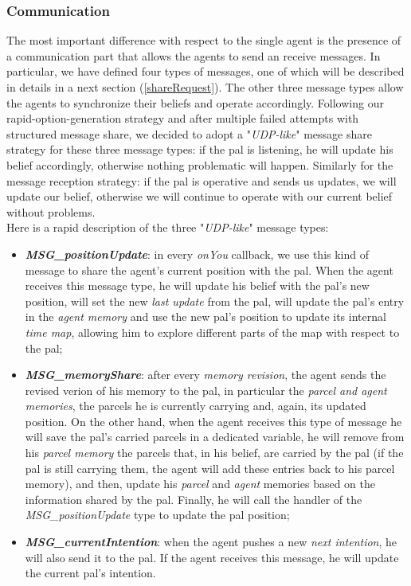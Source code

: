         \subsubsection{Communication}
            The most important difference with respect to the single agent is the presence of a communication part that allows the agents to send an receive messages. In particular, we have defined four types of messages, one of which will be described in details in a next section (\ref{shareRequest}). The other three message types allow the agents to synchronize their beliefs and operate accordingly. Following our rapid-option-generation strategy and after multiple failed attempts with structured message share, we decided to adopt a "\textit{UDP-like}" message share strategy for these three message types: if the pal is listening, he will update his belief accordingly, otherwise nothing problematic will happen. Similarly for the message reception strategy: if the pal is operative and sends us updates, we will update our belief, otherwise we will continue to operate with our current belief without problems.
            \medskip\\
            Here is a rapid description of the three "\textit{UDP-like}" message types:
            \begin{itemize}
                \item \textbf{\textit{MSG\_positionUpdate}}: in every \textit{onYou} callback, we use this kind of message to share the agent's current position with the pal. When the agent receives this message type, he will update his belief with the pal's new position, will set the new \textit{last update} from the pal, will update the pal's entry in the \textit{agent memory} and use the new pal's position to update its internal \textit{time map}, allowing him to explore different parts of the map with respect to the pal;
                \item \textbf{\textit{MSG\_memoryShare}}: after every \textit{memory revision}, the agent sends the revised verion of his memory to the pal, in particular the \textit{parcel and agent memories}, the parcels he is currently carrying  and, again, its updated position. On the other hand, when the agent receives this type of message he will save the pal's carried parcels in a dedicated variable, he will remove from his \textit{parcel memory} the parcels that, in his belief, are carried by the pal (if the pal is still carrying them, the agent will add these entries back to his parcel memory), and then, update his \textit{parcel} and \textit{agent} memories based on the information shared by the pal. Finally, he will call the handler of the \textit{MSG\_positionUpdate} type to update the pal position;
                \item \textbf{\textit{MSG\_currentIntention}}: when the agent pushes a new \textit{next intention}, he will also send it to the pal. If the agent receives this message, he will update the current pal's intention.
            \end{itemize}
            
